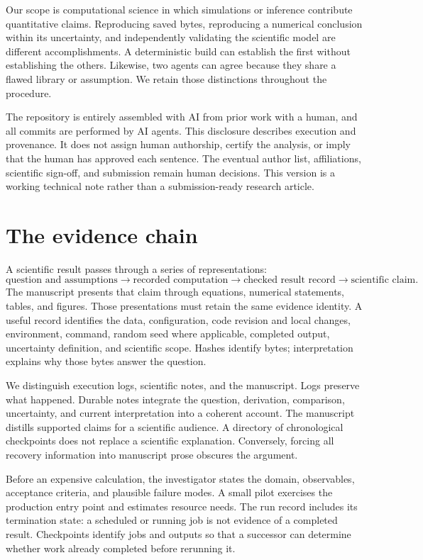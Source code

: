 \documentclass{article}
\begin{document}
Our scope is computational science in which simulations or inference contribute quantitative claims. Reproducing saved bytes, reproducing a numerical conclusion within its uncertainty, and independently validating the scientific model are different accomplishments. A deterministic build can establish the first without establishing the others. Likewise, two agents can agree because they share a flawed library or assumption. We retain those distinctions throughout the procedure.

The repository is entirely assembled with AI from prior work with a human, and all commits are performed by AI agents. This disclosure describes execution and provenance. It does not assign human authorship, certify the analysis, or imply that the human has approved each sentence. The eventual author list, affiliations, scientific sign-off, and submission remain human decisions. This version is a working technical note rather than a submission-ready research article.

\section{The evidence chain}
A scientific result passes through a series of representations:
\[
\text{question and assumptions}
\longrightarrow \text{recorded computation}
\longrightarrow \text{checked result record}
\longrightarrow \text{scientific claim}.
\]
The manuscript presents that claim through equations, numerical statements, tables, and figures. Those presentations must retain the same evidence identity. A useful record identifies the data, configuration, code revision and local changes, environment, command, random seed where applicable, completed output, uncertainty definition, and scientific scope. Hashes identify bytes; interpretation explains why those bytes answer the question.

We distinguish execution logs, scientific notes, and the manuscript. Logs preserve what happened. Durable notes integrate the question, derivation, comparison, uncertainty, and current interpretation into a coherent account. The manuscript distills supported claims for a scientific audience. A directory of chronological checkpoints does not replace a scientific explanation. Conversely, forcing all recovery information into manuscript prose obscures the argument.

Before an expensive calculation, the investigator states the domain, observables, acceptance criteria, and plausible failure modes. A small pilot exercises the production entry point and estimates resource needs. The run record includes its termination state: a scheduled or running job is not evidence of a completed result. Checkpoints identify jobs and outputs so that a successor can determine whether work already completed before rerunning it.
\end{document}
